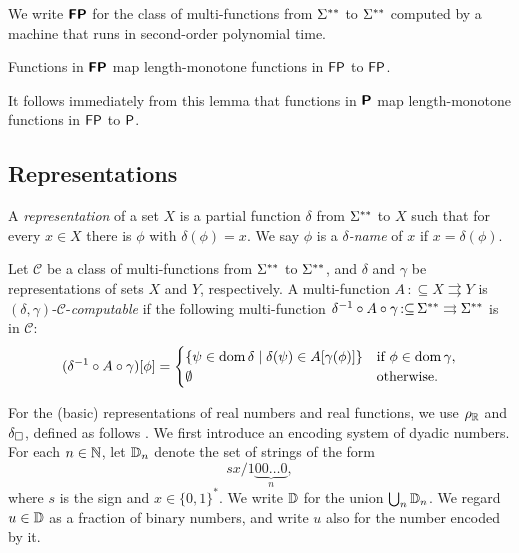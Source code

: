 \documentclass[envcountsame,orivec,oribibl]{llncs}
\newcommand{\pcolon}{\mathpunct{\,:\subseteq}}
\begin{document}
\begin{definition}
 We write $\text{\bfseries \sffamily \upshape FP}$ for the class of
 multi-functions from $\Sigma ^{**}$ to $\Sigma ^{**}$ 
 computed by a machine that runs
 in second-order polynomial time.
\end{definition}

\begin{lemma}
 Functions in $\text{\bfseries \sffamily \upshape FP}$ map 
 length-monotone functions in $\mathsf{FP}$ to $\mathsf{FP}$.
\end{lemma}

It follows immediately from this lemma that functions in $\text{\bfseries \sffamily \upshape P}$ map 
 length-monotone functions in $\mathsf{FP}$ to $\mathsf{P}$.


\subsection{Representations}
\label{subsection: representations}

A {\em representation} of a set $X$ 
is a partial function $\delta$ from $\Sigma ^{**}$ to $X$
such that for every $x \in X$ there is $\phi$ with $\delta (\phi) = x$.
We say $\phi$ is a {\em $\delta$-name} of $x$
if $x = \delta(\phi)$.

Let $\mathcal C$ be a class of multi-functions from $\Sigma ^{**}$ to $\Sigma ^{**}$,
and $\delta$ and $\gamma$ be representations of sets $X$ and $Y$, respectively.
A multi-function $A \pcolon X \rightrightarrows Y$
is $(\delta, \gamma)$-$\mathcal C$-\emph{computable} if 
the following multi-function $\delta^{-1} \circ A \circ \gamma \pcolon \LM \rightrightarrows \LM$ is in $\mathcal C$: 
\begin{equation}
 (\delta^{-1} \circ A \circ \gamma)[\phi] = 
  \begin{cases}
   \{\psi \in \mathop{\rm dom} \delta \mid \delta(\psi) \in A[\gamma(\phi)] \}
   & 
   \text{if } \phi \in \mathop{\rm dom} \gamma, 
   \\ 
   \emptyset 
   &
   \text{otherwise.}
  \end{cases}
\end{equation}

For the (basic) representations of real numbers and real functions,
we use $\rho _\mathbb R$ and $\delta _\square$, 
defined as follows \cite{kawamura2012complexity}.
We first introduce an encoding system of dyadic numbers.
For each $n \in \mathbb N$, let $\mathbb D_n$ denote the set of strings of the form
\begin{equation}
 sx/1\!\underbrace{00\dots0}_{n},
\end{equation}
where $s$ is the sign and $x \in \{0,1\}^*$.
We write $\mathbb D$ for the union $\bigcup _n \mathbb D _n$.
We regard $u \in \mathbb D$ as a fraction of binary numbers, 
and write $u$ also for the number encoded by it.
\end{document}
